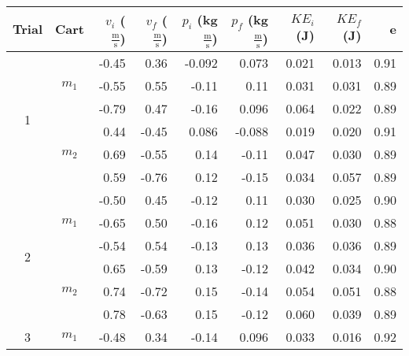 \documentclass [12pt, letterpaper, twoside] {article}
\begin{document}
\begin {table}[h]
  \centering
  \begin {tabular} {| c | c | r | r | r | r | r | r | r |}
    \hline\hline
    Trial & Cart & \(v_{i}\) (\(\tfrac{\text{m}}{\text{s}}\)) & \(v_{f}\) (\(\tfrac{\text{m}}{\text{s}}\)) & \(p_{i}\) (kg\(\tfrac{\text{m}}{\text{s}}\)) & \(p_{f}\) (kg\(\tfrac{\text{m}}{\text{s}}\)) & \(KE_{i}\) (J) & \(KE_{f}\) (J) & e \\
    \hline
    \multirow {6}{*}{1} & \multirow {3}{*}{\(m_{1}\)} & -0.45 & 0.36 & -0.092 & 0.073 & 0.021 & 0.013 & 0.91 \\ %
    & & -0.55 & 0.55 & -0.11 & 0.11 & 0.031 & 0.031 & 0.89 \\ %
    & & -0.79 & 0.47 & -0.16 & 0.096 & 0.064 & 0.022 & 0.89 \\ %
    \cline{2-9}
    & \multirow {3}{*}{\(m_{2}\)} & 0.44 & -0.45 & 0.086 & -0.088 & 0.019 & 0.020 & 0.91 \\ %
    & & 0.69 & -0.55 & 0.14 & -0.11 & 0.047 & 0.030 & 0.89 \\ %
    & & 0.59 & -0.76 & 0.12 & -0.15 & 0.034 & 0.057 & 0.89 \\ %
    \hline
    \multirow {6}{*}{2} & \multirow {3}{*}{\(m_{1}\)} & -0.50 & 0.45 & -0.12 & 0.11 & 0.030 & 0.025 & 0.90 \\ %
    & & -0.65 & 0.50 & -0.16 & 0.12 & 0.051 & 0.030 & 0.88 \\ %
    & & -0.54 & 0.54 & -0.13 & 0.13 & 0.036 & 0.036 & 0.89 \\ %
    \cline{2-9}
    & \multirow {3}{*}{\(m_{2}\)} & 0.65 & -0.59 & 0.13 & -0.12 & 0.042 & 0.034 & 0.90 \\ %
    & & 0.74 & -0.72 & 0.15 & -0.14 & 0.054 & 0.051 & 0.88 \\ %
    & & 0.78 & -0.63 & 0.15 & -0.12 & 0.060 & 0.039 & 0.89 \\ %
    \hline 
    \multirow {6}{*}{3} & \multirow {3}{*}{\(m_{1}\)} & -0.48 & 0.34 & -0.14 & 0.096 & 0.033 & 0.016 & 0.92 \\ %

\end{tabular}
\end{table}
\end{document}
